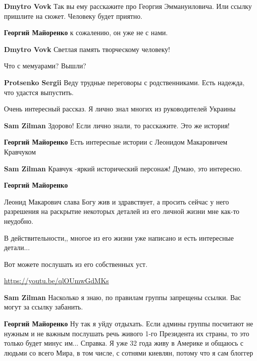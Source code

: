 \begin{itemize}
\begin{itemize}
\begin{itemize}
\textbf{Dmytro Vovk} Так вы ему расскажите про Георгия Эммануиловича. Или ссылку пришлите на сюжет. Человеку будет приятно.

\textbf{Георгий Майоренко} к сожалению, он уже не с нами.

\textbf{Dmytro Vovk} Светлая память творческому человеку!
\end{itemize} %

\end{itemize} %

Что с мемуарами? Вышли?

\begin{itemize} %
\textbf{Protsenko Sergii} Веду трудные переговоры с родственниками. Есть надежда, что удастся выпустить.
\end{itemize} %

Очень интересный рассказ.
Я лично знал многих из руководителей Украины

\begin{itemize} %
\textbf{Sam Zilman} Здорово! Если лично знали, то расскажите. Это же история!

\begin{itemize} %
\textbf{Георгий Майоренко} Есть интересные истории с Леонидом Макаровичем Кравчуком

\textbf{Sam Zilman} Кравчук -яркий исторический персонаж! Думаю, это интересно.

\textbf{Георгий Майоренко} 

Леонид Макарович слава Богу жив и здравствует, а просить сейчас у него
разрешения на раскрытие некоторых деталей из его личной жизни мне как-то
неудобно.

В действительности,, многое из его жизни уже написано и есть интересные детали...

Вот можете послушать из его собственных уст.

\url{https://youtu.be/qlOUmwGdMKs}

\textbf{Sam Zilman} Насколько я знаю, по правилам группы запрещены ссылки. Вас могут за ссылку забанить.

\textbf{Георгий Майоренко} Ну так я уйду отдыхать.
Если админы группы посчитают не нужным и не важным послушать речь живого 1-го Президента их страны, то это только будет минус им...
Справка. Я уже 32 года живу в Америке и общаюсь с людьми со всего Мира, в том числе, с сотнями киевлян, потому что я сам блоггер
\end{itemize} %


\end{itemize}
\end{itemize}
